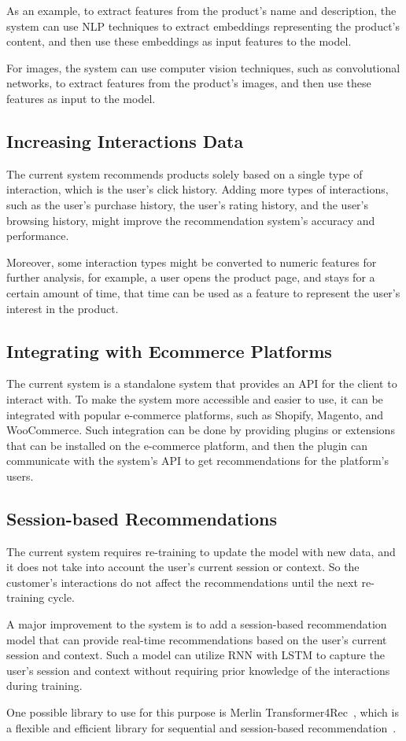 As an example, to extract features from the product's name and description, the system can use NLP
techniques to extract embeddings representing the product's content, and then use these embeddings as input features to the model.

For images, the system can use computer vision techniques, such as convolutional networks, to extract features from the product's images, and then use these features as input to the model.

\subsection{Increasing Interactions Data}

The current system recommends products solely based on a single type of interaction, which is the user's click history.
Adding more types of interactions, such as the user's purchase history, the user's rating history, and the user's browsing history, 
might improve the recommendation system's accuracy and performance.

Moreover, some interaction types might be converted to numeric features for further analysis,
 for example, a user opens the product page, and stays for a certain amount of time, 
 that time can be used as a feature to represent the user's interest in the product.

 \subsection{Integrating with Ecommerce Platforms}

The current system is a standalone system that provides an API for the client to interact with.
To make the system more accessible and easier to use, it can be integrated with popular e-commerce platforms, such as Shopify, Magento, and WooCommerce.
Such integration can be done by providing plugins or extensions that can be installed on the e-commerce platform, 
and then the plugin can communicate with the system's API to get recommendations for the platform's users.

\subsection{Session-based Recommendations}

The current system requires re-training to update the model with new data, and it does not take into account the user's current session or context.
So the customer's interactions do not affect the recommendations until the next re-training cycle.

A major improvement to the system is to add a session-based recommendation model that can provide real-time recommendations based on the user's current session and context.
Such a model can utilize RNN with LSTM to capture the user's session and context without requiring prior knowledge of the interactions during training. 

One possible library to use for this purpose is Merlin Transformer4Rec~\cite{NvidiaMerlinTransformers4Rec}, 
which is a flexible and efficient library for sequential and session-based recommendation~\cite{NvidiaMerlinTransformers4Rec}.

